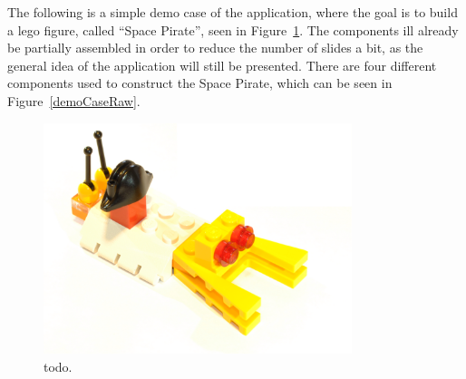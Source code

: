 The following is a simple demo case of the application, where the goal is to build a lego figure, called ``Space Pirate'', seen in Figure~\ref{demoCaseGoal}. The components ill already be partially assembled in order to reduce the number of slides a bit, as the general idea of the application will still be presented. There are four different components used to construct the Space Pirate, which can be seen in Figure~\ref{demoCaseRaw}.

	\begin{figure}[ht!]
		\centering
		\includegraphics[width=90mm]{images/rawImages/BILD_6}
		\caption{todo.}
		\label{demoCaseGoal}
	\end{figure}

